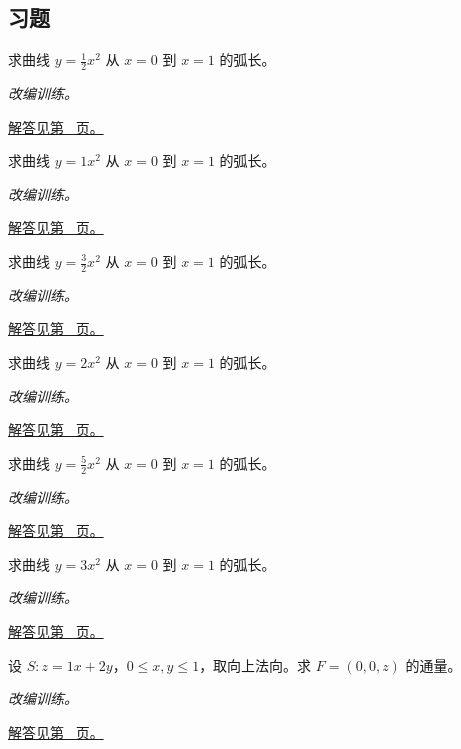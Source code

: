 \documentclass[UTF8,12pt,a4paper,fontset=fandol]{ctexart}
\begin{document}
\subsection{习题}
\begin{example}[抛物线弧长]\label{ex:c42q1}
求曲线 $y=\frac{1}{2}x^2$ 从 $x=0$ 到 $x=1$ 的弧长。
\par\textit{改编训练。}\par\hyperref[ans:c42q1]{解答见第~\pageref{ans:c42q1} 页。}
\end{example}
\begin{example}[抛物线弧长]\label{ex:c42q2}
求曲线 $y=1x^2$ 从 $x=0$ 到 $x=1$ 的弧长。
\par\textit{改编训练。}\par\hyperref[ans:c42q2]{解答见第~\pageref{ans:c42q2} 页。}
\end{example}
\begin{example}[抛物线弧长]\label{ex:c42q3}
求曲线 $y=\frac{3}{2}x^2$ 从 $x=0$ 到 $x=1$ 的弧长。
\par\textit{改编训练。}\par\hyperref[ans:c42q3]{解答见第~\pageref{ans:c42q3} 页。}
\end{example}
\begin{example}[抛物线弧长]\label{ex:c42q4}
求曲线 $y=2x^2$ 从 $x=0$ 到 $x=1$ 的弧长。
\par\textit{改编训练。}\par\hyperref[ans:c42q4]{解答见第~\pageref{ans:c42q4} 页。}
\end{example}
\begin{example}[抛物线弧长]\label{ex:c42q5}
求曲线 $y=\frac{5}{2}x^2$ 从 $x=0$ 到 $x=1$ 的弧长。
\par\textit{改编训练。}\par\hyperref[ans:c42q5]{解答见第~\pageref{ans:c42q5} 页。}
\end{example}
\begin{example}[抛物线弧长]\label{ex:c42q6}
求曲线 $y=3x^2$ 从 $x=0$ 到 $x=1$ 的弧长。
\par\textit{改编训练。}\par\hyperref[ans:c42q6]{解答见第~\pageref{ans:c42q6} 页。}
\end{example}
\begin{example}[平面片的向上通量]\label{ex:c42q7}
设 $S:z=1x+2y$，$0\le x,y\le1$，取向上法向。求 $F=(0,0,z)$ 的通量。
\par\textit{改编训练。}\par\hyperref[ans:c42q7]{解答见第~\pageref{ans:c42q7} 页。}
\end{example}
\end{document}
